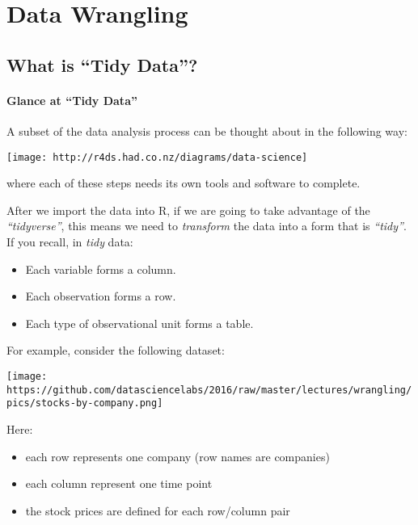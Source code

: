 \documentclass[]{article}
\providecommand{\tightlist}{%
  \setlength{\itemsep}{0pt}\setlength{\parskip}{0pt}}
\let\oldparagraph\paragraph
\renewcommand{\paragraph}[1]{\oldparagraph{#1}\mbox{}}
\begin{document}
\hypertarget{data-wrangling}{%
\section{Data Wrangling}\label{data-wrangling}}

\hypertarget{what-is-tidy-data}{%
\subsection{What is ``Tidy Data''?}\label{what-is-tidy-data}}

\hypertarget{glance-at-tidy-data}{%
\paragraph{Glance at ``Tidy Data''}\label{glance-at-tidy-data}}

A subset of the data analysis process can be thought about in the
following way:

\texttt{[image: http://r4ds.had.co.nz/diagrams/data-science]}

where each of these steps needs its own tools and software to complete.

After we import the data into R, if we are going to take advantage of
the \emph{``tidyverse''}, this means we need to \emph{transform} the
data into a form that is \emph{``tidy''}. If you recall, in \emph{tidy}
data:

\begin{itemize}
\tightlist
\item
  Each variable forms a column.
\item
  Each observation forms a row.
\item
  Each type of observational unit forms a table.
\end{itemize}

For example, consider the following dataset:

\texttt{[image: https://github.com/datasciencelabs/2016/raw/master/lectures/wrangling/pics/stocks-by-company.png]}

Here:

\begin{itemize}
\tightlist
\item
  each row represents one company (row names are companies)
\item
  each column represent one time point
\item
  the stock prices are defined for each row/column pair
\end{itemize}
\end{document}
